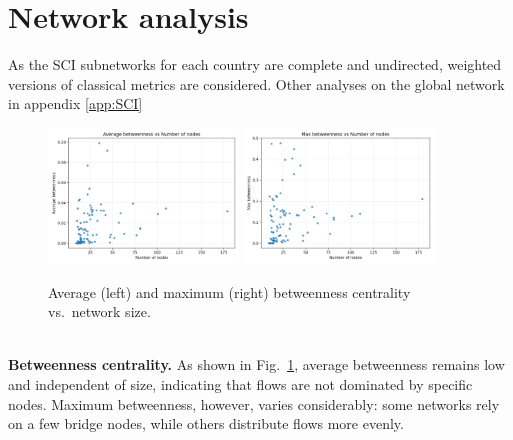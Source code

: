 \section{Network analysis}
As the SCI subnetworks for each country are complete and undirected, weighted versions of classical metrics are considered. Other analyses on the global network in appendix \ref{app:SCI}\\
\begin{figure}[h!]
    \centering
    \includegraphics[width=0.45\textwidth]{images/TASK3/metrics_betweenness_avg_vs_n_nodes.png}
    \includegraphics[width=0.45\textwidth]{images/TASK3/metrics_betweenness_max_vs_n_nodes.png}
    \caption{Average (left) and maximum (right) betweenness centrality vs.\ network size.}
    \label{fig:betweenness}
\end{figure}\\
\textbf{Betweenness centrality.}  
As shown in Fig.~\ref{fig:betweenness}, average betweenness remains low and independent of size, indicating that flows are not dominated by specific nodes.  
Maximum betweenness, however, varies considerably: some networks rely on a few bridge nodes, while others distribute flows more evenly.\\
